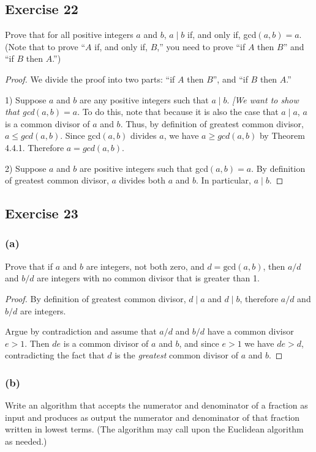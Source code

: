 \documentclass[14pt]{extarticle}
\begin{document}
\subsection{Exercise 22}
Prove that for all positive integers $a$ and $b$, $a \mid b$ if, and only if, gcd$(a, b) = a$. (Note that to prove “$A$ if, and only if, $B$,” you need to prove “if $A$ then $B$” and “if $B$ then $A$.”)

\begin{proof}
We divide the proof into two parts: “if $A$ then $B$”, and “if $B$ then $A$.”

1) Suppose $a$ and $b$ are any positive integers such that $a\mid b$. {\it [We want to show that gcd$(a, b) = a$}. To do this, note that because it is also the case that $a \mid a$, $a$ is a common divisor of $a$ and $b$. Thus, by definition of greatest common divisor, $a \leq gcd(a, b)$. Since gcd$(a,b)$ divides $a$, we have $a \geq gcd(a, b)$ by Theorem 4.4.1. Therefore $a = gcd(a,b)$.

2) Suppose $a$ and $b$ are positive integers such that gcd$(a, b) = a$. By definition of greatest common divisor, $a$ divides both $a$ and $b$. In particular, $a \mid b$.
\end{proof}

\subsection{Exercise 23}
\subsubsection{(a)}
Prove that if $a$ and $b$ are integers, not both zero, and $d = \text{gcd}(a, b)$, then $a/d$ and $b/d$ are integers with no common divisor that is greater than 1.

\begin{proof}
By definition of greatest common divisor, $d \mid a$ and $d \mid b$, therefore $a/d$ and $b/d$ are integers.

Argue by contradiction and assume that $a/d$ and $b/d$ have a common divisor $e > 1$. Then $de$ is a common divisor of $a$ and $b$, and since $e > 1$ we have $de > d$, contradicting the fact that $d$ is the {\it greatest} common divisor of $a$ and $b$.
\end{proof}

\subsubsection{(b)}
Write an algorithm that accepts the numerator and denominator of a fraction as input and produces as output the numerator and denominator of that fraction written in lowest terms. (The algorithm may call upon the Euclidean algorithm as needed.)
\end{document}
